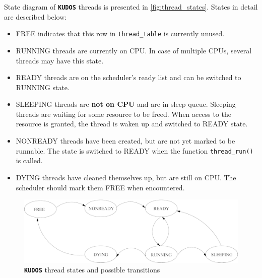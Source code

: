 \documentclass[twoside,a4paper]{report}
\newlength{\tablewidth}
\newcommand{\kudos}{\texttt{\textbf{KUDOS}}}
\begin{document}
State diagram of \kudos{} threads is presented in
\autoref{fig:thread_states}. States in detail are described below:


\begin{itemize}
\item FREE  indicates that this row in
  \texttt{thread\_table} is currently unused.

\item RUNNING  threads are currently
on CPU. In case of multiple CPUs, several threads may have this state.

\item READY  threads are on the
scheduler's ready list and can be switched to RUNNING state.
 
\item SLEEPING  threads are
\textbf{not on CPU} and are in sleep queue. Sleeping threads are
waiting for some resource to be freed. When access to the resource is
granted, the thread is waken up and switched to READY state.
 
\item NONREADY  threads have been
created, but are not yet marked to be runnable. The state is switched to
READY when the function \texttt{thread\_run()} is called.

\item DYING  threads have cleaned
themselves up, but are still on CPU. The scheduler should mark them FREE
when encountered.
\end{itemize}

\begin{figure}
\begin{center}
\includegraphics[width=\tablewidth]{pics/thread_states.png}
\caption{\kudos{} thread states and possible transitions}
\label{fig:thread_states}
\end{center}
\end{figure}
\end{document}
